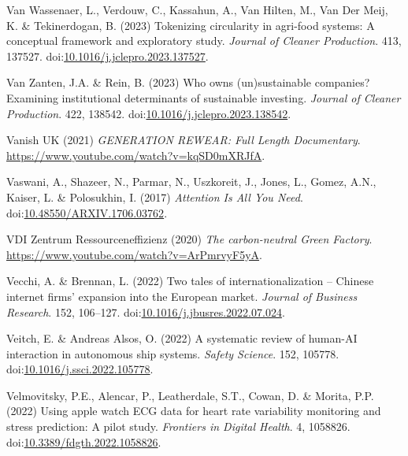 \documentclass[
  letterpaper,
  DIV=11,
  numbers=noendperiod]{scrartcl}
\newlength{\cslhangindent}
\newenvironment{CSLReferences}[2] %
 {\begin{list}{}{%
  \setlength{\itemindent}{0pt}
  \setlength{\leftmargin}{0pt}
  \setlength{\parsep}{0pt}
  \ifodd #1
   \setlength{\leftmargin}{\cslhangindent}
   \setlength{\itemindent}{-1\cslhangindent}
  \fi
  \setlength{\itemsep}{#2\baselineskip}}}
 {\end{list}}
\begin{document}
\begin{CSLReferences}{0}{1}
Van Wassenaer, L., Verdouw, C., Kassahun, A., Van Hilten, M., Van Der
Meij, K. \& Tekinerdogan, B. (2023) Tokenizing circularity in agri-food
systems: {A} conceptual framework and exploratory study. \emph{Journal
of Cleaner Production}. 413, 137527.
doi:\href{https://doi.org/10.1016/j.jclepro.2023.137527}{10.1016/j.jclepro.2023.137527}.

Van Zanten, J.A. \& Rein, B. (2023) Who owns (un)sustainable companies?
{Examining} institutional determinants of sustainable investing.
\emph{Journal of Cleaner Production}. 422, 138542.
doi:\href{https://doi.org/10.1016/j.jclepro.2023.138542}{10.1016/j.jclepro.2023.138542}.

Vanish UK (2021) \emph{{GENERATION REWEAR}: {Full Length Documentary}}.
\url{https://www.youtube.com/watch?v=kqSD0mXRJfA}.

Vaswani, A., Shazeer, N., Parmar, N., Uszkoreit, J., Jones, L., Gomez,
A.N., Kaiser, L. \& Polosukhin, I. (2017) \emph{Attention {Is All You
Need}}.
doi:\href{https://doi.org/10.48550/ARXIV.1706.03762}{10.48550/ARXIV.1706.03762}.

VDI Zentrum Ressourceneffizienz (2020) \emph{The carbon-neutral {Green
Factory}}. \url{https://www.youtube.com/watch?v=ArPmrvyF5yA}.

Vecchi, A. \& Brennan, L. (2022) Two tales of internationalization --
{Chinese} internet firms' expansion into the {European} market.
\emph{Journal of Business Research}. 152, 106--127.
doi:\href{https://doi.org/10.1016/j.jbusres.2022.07.024}{10.1016/j.jbusres.2022.07.024}.

Veitch, E. \& Andreas Alsos, O. (2022) A systematic review of human-{AI}
interaction in autonomous ship systems. \emph{Safety Science}. 152,
105778.
doi:\href{https://doi.org/10.1016/j.ssci.2022.105778}{10.1016/j.ssci.2022.105778}.

Velmovitsky, P.E., Alencar, P., Leatherdale, S.T., Cowan, D. \& Morita,
P.P. (2022) Using apple watch {ECG} data for heart rate variability
monitoring and stress prediction: {A} pilot study. \emph{Frontiers in
Digital Health}. 4, 1058826.
doi:\href{https://doi.org/10.3389/fdgth.2022.1058826}{10.3389/fdgth.2022.1058826}.


\end{CSLReferences}
\end{document}
